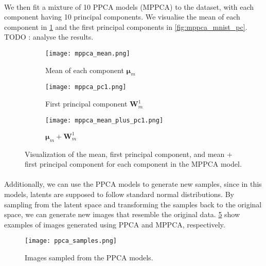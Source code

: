 \documentclass{article}
\begin{document}
\paragraph{} We then fit a mixture of 10 PPCA models (MPPCA) to the dataset, with each component having 10 principal components. We visualise the mean of each component in \cref{fig:mppca_mnist_mean} and the first principal components in \cref{fig:mppca_mnist_pc}. TODO : analyse the results. 

\begin{figure}[H]
    \centering
    \begin{subfigure}[b]{0.1\textwidth}
        \centering
        \texttt{[image: mppca\_mean.png]}
        \caption{Mean of each component $\boldsymbol{\mu}_m$}
        \label{fig:mppca_mnist_mean}
    \end{subfigure}
    \hfill
    \begin{subfigure}[b]{0.1\textwidth}
        \centering
        \texttt{[image: mppca\_pc1.png]}
        \caption{First principal component $\mathbf{W}_m^1$}
        \label{fig:mppca_mnist_pc1}
    \end{subfigure}
    \hfill
    \begin{subfigure}[b]{0.1\textwidth}
        \centering
        \texttt{[image: mppca\_mean\_plus\_pc1.png]}
        \caption{$\boldsymbol{\mu}_m + \mathbf{W}_m^1$}
        \label{fig:mppca_mnist_mean_plus_pc1}
    \end{subfigure}
    \caption{Visualization of the mean, first principal component, and mean + first principal component for each component in the MPPCA model.}
    \label{fig:mppca_mnist}
\end{figure}

\paragraph{} Additionally, we can use the PPCA models to generate new samples, since in this models, latents are supposed to follow standard normal distributions. By sampling from the latent space and transforming the samples back to the original space, we can generate new images that resemble the original data. \cref{fig:ppca_samples} show examples of images generated using PPCA and MPPCA, respectively.

\begin{figure}[H]
    \centering
    \texttt{[image: ppca\_samples.png]}
    \caption{Images sampled from the PPCA models.}
    \label{fig:ppca_samples}
\end{figure}
\end{document}
